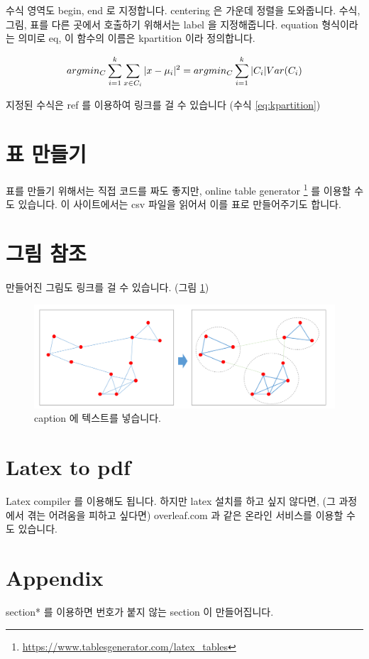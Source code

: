 \documentclass[11pt]{article}
\begin{document}
수식 영역도 begin, end 로 지정합니다.
centering 은 가운데 정렬을 도와줍니다.
수식, 그림, 표를 다른 곳에서 호출하기 위해서는 label 을 지정해줍니다.
equation 형식이라는 의미로 eq, 이 함수의 이름은 kpartition 이라 정의합니다.

\begin{equation}
\label{eq:kpartition}
\centering
arg min_C\sum_{i=1}^{k} \sum_{x \in C_i} \vert x - \mu_i \vert^2 = arg min_C \sum_{i=1}^{k} \vert C_i \vert Var(C_i)
\end{equation}

지정된 수식은 ref 를 이용하여 링크를 걸 수 있습니다 (수식 \ref{eq:kpartition})

\section{표 만들기}

표를 만들기 위해서는 직접 코드를 짜도 좋지만, online table generator \footnote{\url{https://www.tablesgenerator.com/latex_tables}} 를 이용할 수도 있습니다. 
이 사이트에서는 csv 파일을 읽어서 이를 표로 만들어주기도 합니다.

\section{그림 참조}

만들어진 그림도 링크를 걸 수 있습니다. (그림 \ref{fig:community_detection})

\begin{figure}[ht]
\centering
\includegraphics[keepaspectratio=true, width=0.5\linewidth]{figures/community_detection.png}
\caption{caption 에 텍스트를 넣습니다.}
\label{fig:community_detection}
\end{figure}

\section{Latex to pdf}

Latex compiler 를 이용해도 됩니다.
하지만 latex 설치를 하고 싶지 않다면, (그 과정에서 겪는 어려움을 피하고 싶다면) overleaf.com 과 같은 온라인 서비스를 이용할 수도 있습니다.

%



\section*{Appendix}

section* 를 이용하면 번호가 붙지 않는 section 이 만들어집니다.
\end{document}
